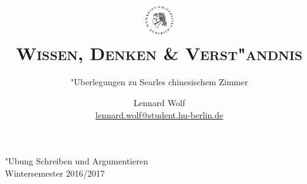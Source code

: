 \documentclass[a4paper, emulatestandardclasses, 12pt]{scrartcl}
\date{\vspace{-3ex}}
\begin{document}
\title{%
	\includegraphics*[width=0.1\textwidth]{images/hu_logo2.png}\\
	\vspace{50pt}
	\scshape\LARGE{Wissen, Denken \& Verst"andnis}}
	
	\subtitle{"Uberlegungen zu Searles chinesischem Zimmer}
\author{Lennard Wolf\\
        \small{\href{mailto:lennard.wolf@student.hu-berlin.de}{lennard.wolf@student.hu-berlin.de}}}      

\maketitle

\vspace{\fill}

\begin{minipage}[b]{\textwidth}
    \centering
    \onehalfspacing
    \large   
    "Ubung Schreiben und Argumentieren\\
    Wintersemester 2016/2017

    \vspace{-20mm} 
\end{minipage}%
\thispagestyle{empty}
\newpage
\clearpage
\setcounter{page}{1}
\end{document}
